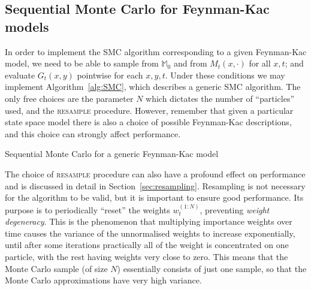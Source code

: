 \subsection{Sequential Monte Carlo for Feynman-Kac models}
\label{sec:SMC_FK}
In order to implement the SMC algorithm corresponding to a given Feynman-Kac model, we need to be able to sample from $\mathbb{M}_0$ and from $M_t(x, \cdot)$ for all $x,t$; and evaluate $G_t(x, y)$ pointwise for each $x,y, t$.
Under these conditions we may implement Algorithm~\ref{alg:SMC}, which describes a generic SMC algorithm. 
The only free choices are the parameter $N$ which dictates the number of ``particles'' used, and the \textsc{resample} procedure.
However, remember that given a particular state space model there is also a choice of possible Feynman-Kac descriptions, and this choice can strongly affect performance.

\begin{algorithm}[ht]
\vspace*{10pt}
\DontPrintSemicolon
{}
\vspace*{10pt}
\caption[Sequential Monte Carlo]{Sequential Monte Carlo for a generic Feynman-Kac model}
\label{alg:SMC}
\end{algorithm}

The choice of \textsc{resample} procedure can also have a profound effect on performance and is discussed in detail in Section~\ref{sec:resampling}. 
Resampling is not necessary for the algorithm to be valid, but it is important to ensure good performance. Its purpose is to periodically ``reset'' the weights $w_t^{(1:N)}$, preventing \emph{weight degeneracy}. This is the phenomenon that multiplying importance weights over time causes the variance of the unnormalised weights to increase exponentially, until after some iterations practically all of the weight is concentrated on one particle, with the rest having weights very close to zero. This means that the Monte Carlo sample (of size $N$) essentially consists of just one sample, so that the Monte Carlo approximations have very high variance.

